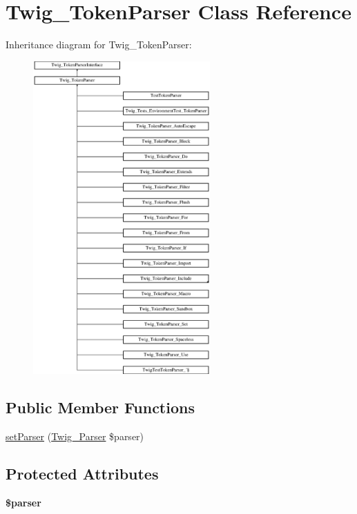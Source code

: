 \hypertarget{classTwig__TokenParser}{}\section{Twig\+\_\+\+Token\+Parser Class Reference}
\label{classTwig__TokenParser}
Inheritance diagram for Twig\+\_\+\+Token\+Parser\+:\begin{figure}[H]
\begin{center}
\leavevmode
\includegraphics[height=12.000000cm]{classTwig__TokenParser}
\end{center}
\end{figure}
\subsection*{Public Member Functions}
\begin{DoxyCompactItemize}
\item 
\hyperlink{classTwig__TokenParser_a90b82e11a4029a4ccec5e5c08dd86f7b}{set\+Parser} (\hyperlink{classTwig__Parser}{Twig\+\_\+\+Parser} \$parser)
\end{DoxyCompactItemize}
\subsection*{Protected Attributes}
\begin{DoxyCompactItemize}
\item 
{\bfseries \$parser}\hypertarget{classTwig__TokenParser_aa37b0f2e0122c7fb99973a9a2f75897f}{}\label{classTwig__TokenParser_aa37b0f2e0122c7fb99973a9a2f75897f}

\end{DoxyCompactItemize}


